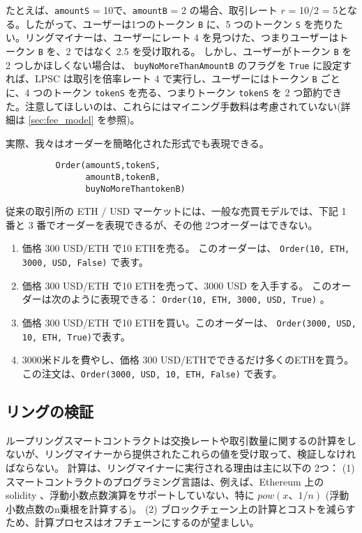 \documentclass{article}
\begin{document}
\begin{multicols}{2}
たとえば、\verb|amountS| = 10で、\verb|amountB| = 2 の場合、取引レート $r$ = 10/2 = 5となる。したがって、ユーザーは1つのトークン \verb|B| に、5 つのトークン \verb|S| を売りたい。リングマイナーは、ユーザーにレート 4 を見つけた、つまりユーザーはトークン \verb|B| を、2 ではなく 2.5 を受け取れる。
しかし、ユーザーがトークン \verb|B| を 2 つしかほしくない場合は、 \verb|buyNoMoreThanAmountB| のフラグを \verb|True| に設定すれば、LPSC は取引を倍率レート 4 で実行し、ユーザーにはトークン \verb|B| ごとに、4 つのトークン \verb|tokenS| を売る、つまりトークン \verb|tokenS| を 2 つ節約できた。注意してほしいのは、これらにはマイニング手数料は考慮されていない(詳細は \ref{sec:fee_model} を参照)。

実際、我々はオーダーを簡略化された形式でも表現できる。

\begin{verbatim}
	      Order(amountS,tokenS,
	            amountB,tokenB,
	            buyNoMoreThantokenB)
\end{verbatim}

従来の取引所の ETH / USD マーケットには、一般な売買モデルでは、下記 1 番と 3 番でオーダーを表現できるが、その他 2つオーダーはできない。

\begin{enumerate}
\item 価格 300 USD/ETH で10 ETHを売る。 このオーダーは、 \verb|Order(10, ETH, 3000, USD, False)| で表す。
\item 価格 300 USD/ETH で10 ETHを売って、3000 USD を入手する。 このオーダーは次のように表現できる： \verb|Order(10, ETH, 3000, USD, True)| 。
\item 価格 300 USD/ETH で10 ETHを買い。このオーダーは、 \verb|Order(3000, USD, 10, ETH, True)|で表す。
\item 3000米ドルを費やし、価格 300 USD/ETHでできるだけ多くのETHを買う。この注文は、\verb|Order(3000, USD, 10, ETH, False)| で表す。
\end{enumerate}


\subsection{リングの検証\label{sec:ring_verification}}
ループリングスマートコントラクトは交換レートや取引数量に関するの計算をしないが、リングマイナーから提供されたこれらの値を受け取って、検証しなければならない。 計算は、リングマイナーに実行される理由は主に以下の 2つ：
(1) スマートコントラクトのプログラミング言語は、例えば、Ethereum 上の solidity \cite{dannen2017introducing}、浮動小数点数演算をサポートしていない、特に $pow(x、1 / n )$ (浮動小数点数のn乗根を計算する)。 (2) ブロックチェーン上の計算とコストを減らすため、計算プロセスはオフチェーンにするのが望ましい。



\end{multicols}
\end{document}
